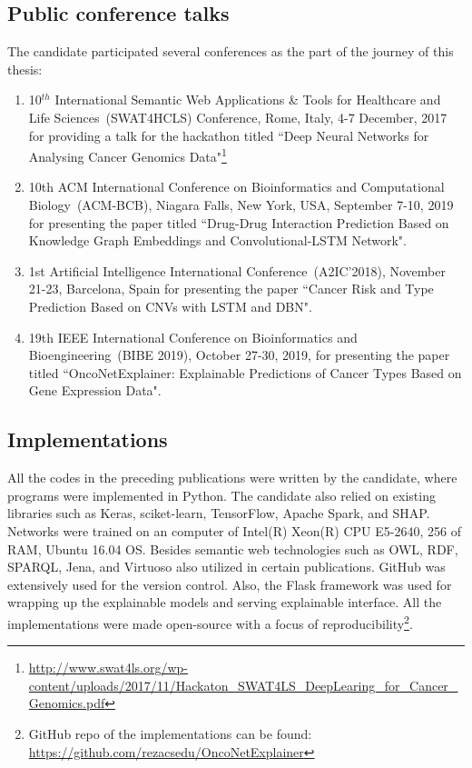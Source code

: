 
\subsection{Public conference talks}
The candidate participated several conferences as the part of the journey of this thesis: 
\begin{enumerate}[noitemsep]
    \item 10$^{th}$ International Semantic Web Applications \& Tools for Healthcare and Life Sciences~(SWAT4HCLS) Conference, Rome, Italy, 4-7 December, 2017 for providing a talk for the hackathon titled ``Deep Neural Networks for Analysing Cancer Genomics Data"\footnote{\url{http://www.swat4ls.org/wp-content/uploads/2017/11/Hackaton_SWAT4LS_DeepLearing_for_Cancer_Genomics.pdf}}
	\item 10th ACM International Conference on Bioinformatics and Computational Biology~(ACM-BCB), Niagara Falls, New York, USA, September 7-10, 2019 for presenting the paper titled ``Drug-Drug Interaction Prediction Based on Knowledge Graph Embeddings and Convolutional-LSTM Network".
	\item 1st Artificial Intelligence International Conference~(A2IC'2018), November 21-23, Barcelona, Spain for presenting the paper ``Cancer Risk and Type Prediction Based on CNVs with LSTM and DBN". 
	\item 19th IEEE International Conference on Bioinformatics and Bioengineering~(BIBE 2019), October 27-30, 2019, for presenting the paper titled ``OncoNetExplainer: Explainable Predictions of Cancer Types Based on Gene Expression Data".
\end{enumerate}

\subsection{Implementations}
All the codes in the preceding publications were written by the candidate, where programs were implemented in Python. The candidate also relied on existing libraries such as Keras, sciket-learn, TensorFlow, Apache Spark, and SHAP. %
Networks were trained on an computer of Intel(R) Xeon(R) CPU E5-2640, 256 of RAM, Ubuntu 16.04 OS. 
Besides semantic web technologies such as OWL, RDF, SPARQL, Jena, and Virtuoso also utilized in certain publications. GitHub was extensively used for the  version control. Also, the Flask framework was used for wrapping up the explainable models and serving  explainable interface. All the implementations were made open-source with a focus of reproducibility\footnote{GitHub repo of the implementations can be found: \url{https://github.com/rezacsedu/OncoNetExplainer}}.

